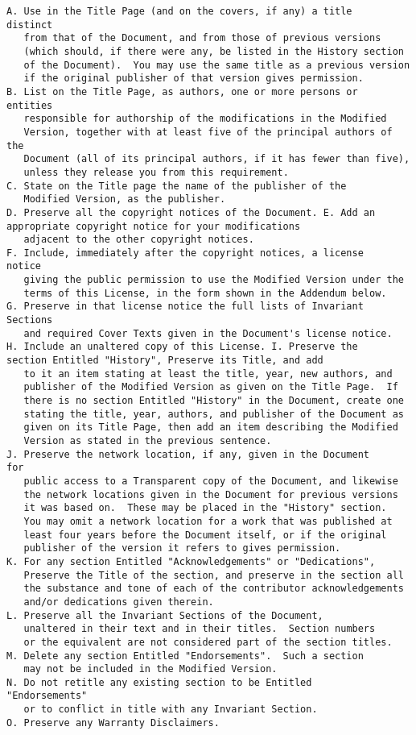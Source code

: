\begin{verbatim}
A. Use in the Title Page (and on the covers, if any) a title
distinct
   from that of the Document, and from those of previous versions
   (which should, if there were any, be listed in the History section
   of the Document).  You may use the same title as a previous version
   if the original publisher of that version gives permission.
B. List on the Title Page, as authors, one or more persons or
entities
   responsible for authorship of the modifications in the Modified
   Version, together with at least five of the principal authors of the
   Document (all of its principal authors, if it has fewer than five),
   unless they release you from this requirement.
C. State on the Title page the name of the publisher of the
   Modified Version, as the publisher.
D. Preserve all the copyright notices of the Document. E. Add an
appropriate copyright notice for your modifications
   adjacent to the other copyright notices.
F. Include, immediately after the copyright notices, a license
notice
   giving the public permission to use the Modified Version under the
   terms of this License, in the form shown in the Addendum below.
G. Preserve in that license notice the full lists of Invariant
Sections
   and required Cover Texts given in the Document's license notice.
H. Include an unaltered copy of this License. I. Preserve the
section Entitled "History", Preserve its Title, and add
   to it an item stating at least the title, year, new authors, and
   publisher of the Modified Version as given on the Title Page.  If
   there is no section Entitled "History" in the Document, create one
   stating the title, year, authors, and publisher of the Document as
   given on its Title Page, then add an item describing the Modified
   Version as stated in the previous sentence.
J. Preserve the network location, if any, given in the Document
for
   public access to a Transparent copy of the Document, and likewise
   the network locations given in the Document for previous versions
   it was based on.  These may be placed in the "History" section.
   You may omit a network location for a work that was published at
   least four years before the Document itself, or if the original
   publisher of the version it refers to gives permission.
K. For any section Entitled "Acknowledgements" or "Dedications",
   Preserve the Title of the section, and preserve in the section all
   the substance and tone of each of the contributor acknowledgements
   and/or dedications given therein.
L. Preserve all the Invariant Sections of the Document,
   unaltered in their text and in their titles.  Section numbers
   or the equivalent are not considered part of the section titles.
M. Delete any section Entitled "Endorsements".  Such a section
   may not be included in the Modified Version.
N. Do not retitle any existing section to be Entitled
"Endorsements"
   or to conflict in title with any Invariant Section.
O. Preserve any Warranty Disclaimers.


\end{verbatim}
